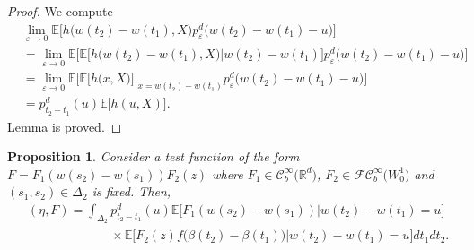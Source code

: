 \documentclass[]{interact}
\newcommand{\E}{{\mathbb{E}}}
\newcommand{\R}{{\mathbb{R}}}
\newcommand{\1}{\mathbf{1}}
\newcommand{\ve}{\varepsilon}
\theoremstyle{plain}%
\newtheorem{prop}[thm]{Proposition}
\theoremstyle{definition}
\theoremstyle{remark}
\begin{document}
\begin{proof}
We compute
\begin{align*}
&\lim_{\ve \to 0} \E \Big[ h\big( w(t_2)-w(t_1),X \big) p_\ve ^d\big( w(t_2)-w(t_1)-u\big)\Big]\\
&=\lim_{\ve \to 0} \E \Bigg[  \E \Big[h\big( w(t_2)-w(t_1),X \big)\Big| w(t_2)-w(t_1)  \Big] p_\ve ^d\big( w(t_2)-w(t_1)-u\big)  \Bigg]\\
&=\lim_{\ve \to 0} \E \Big[  \E \big[h\big( x,X \big) \big] \Big|_{x= w(t_2)-w(t_1)} p_\ve ^d\big( w(t_2)-w(t_1)-u\big)  \Big]\\
&=p_{t_2-t_1}^d(u)\E \big[ h ( u,X ) \big].
\end{align*}
Lemma is proved.
\end{proof}

\begin{prop}\label{P8}
Consider a test function of the form $F=F_1(w(s_2)-w(s_1))F_2(z)$ where $F_1\in \mathcal{C}_b^{\infty} \big( \R^d \big)$, $F_2\in \mathcal{FC}_b^{\infty} \big( W_0^1 \big)$ and $(s_1,s_2)\in \Delta_2$ is fixed. Then, 
\begin{align*}
&( \eta, F )= \int_{\Delta_2  } p_{t_2-t_1}^d(u)\E \Big[F_1(w(s_2)-w(s_1))\Big | w(t_2)-w(t_1)=u\Big]\\
&\phantom{( \eta, F )= \int_{\Delta_2  }} \times \E \Big[F_2(z)f\big( \beta(t_2)-\beta(t_1)\big )\Big | w(t_2)-w(t_1)=u\Big] dt_1dt_2. 
\end{align*} 
\end{prop}
\end{document}
